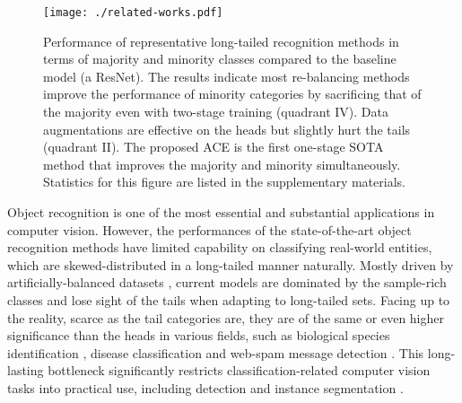 \documentclass[10pt,twocolumn,letterpaper]{article}
\begin{document}
\begin{figure}[!t]
\begin{center}
\texttt{[image: ./related-works.pdf]}
\end{center}
   \caption{Performance of representative long-tailed recognition methods in terms of majority and minority classes compared to the baseline model (a ResNet). The results indicate most re-balancing methods improve the performance of minority categories by sacrificing that of the majority even with two-stage training (quadrant IV). Data augmentations are effective on the heads but slightly hurt the tails (quadrant II). The proposed ACE is the first one-stage SOTA method that improves the majority and minority simultaneously. Statistics for this figure are listed in the supplementary materials.}
\label{fig:related_works}
\end{figure}

Object recognition is one of the most essential and substantial applications in computer vision. However, the performances of the state-of-the-art object recognition methods have limited capability on classifying real-world entities, which are skewed-distributed in a long-tailed manner naturally. Mostly driven by artificially-balanced datasets \cite{ deng2009imagenet,krizhevsky2009learning}, current models are dominated by the sample-rich classes and lose sight of the tails when adapting to long-tailed sets. Facing up to the reality, scarce as the tail categories are, they are of the same or even higher significance than the heads in various fields, such as biological species identification \cite{van2018inaturalist}, disease classification \cite{wang2020imbalance} and web-spam message detection \cite{zhao2020heterogeneous}. This long-lasting bottleneck significantly restricts classification-related computer vision tasks into practical use, including detection \cite{tan2020equalization, wu2020forest, yu2021towards} and instance segmentation \cite{wang2020devil, zang2021fasa}.
\end{document}
